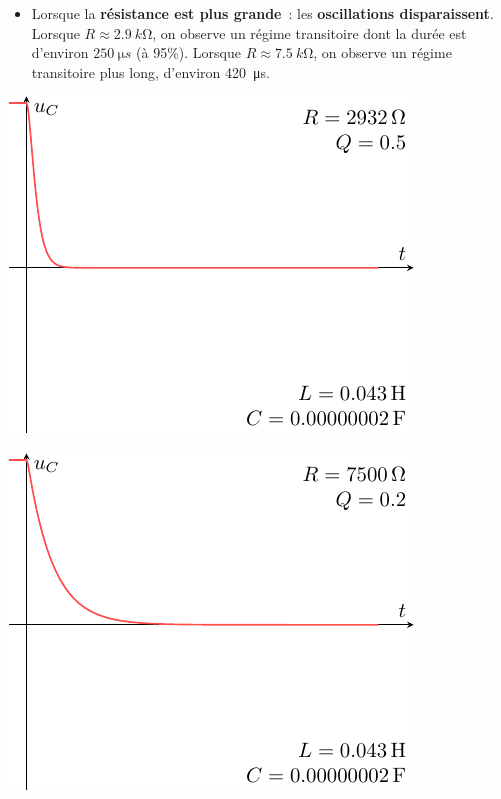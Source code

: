 \documentclass[../../main/main.tex]{subfiles}
\begin{document}
\begin{itemize}
	\item Lorsque la \textbf{résistance est plus grande}~: les
	      \textbf{oscillations disparaissent}.
	      \bigbreak
	      Lorsque $R \approx \SI{2,9}{k\ohm}$, on
	      observe un régime transitoire dont la durée est d'environ $\SI{250}{\micro
			      s}$ (à 95\%). Lorsque $R \approx \SI{7.5}{k\ohm}$, on observe un régime
	      transitoire plus long, d'environ \SI{420}{\micro s}.
\end{itemize}
\begin{minipage}{0.45\linewidth}
	\begin{center}
		\includegraphics[width=\linewidth]{carac-rlc-05}
	\end{center}
\end{minipage}
\hfill
\begin{minipage}{0.45\linewidth}
	\begin{center}
		\includegraphics[width=\linewidth]{carac-rlc-02}
	\end{center}
\end{minipage}
\end{document}
